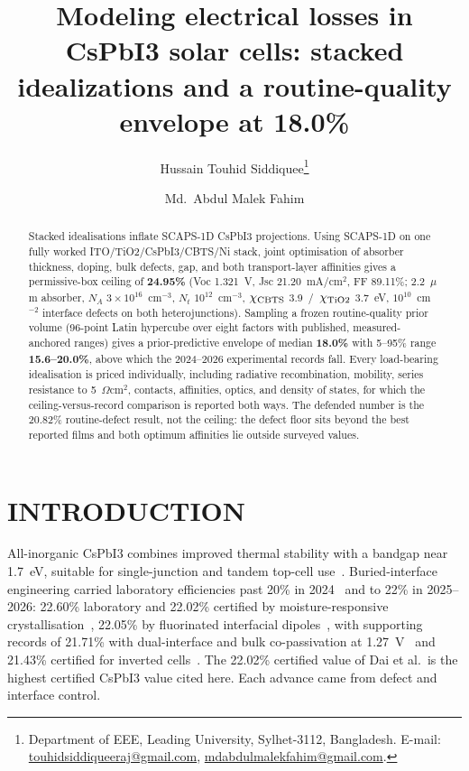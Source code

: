 \documentclass[11pt,a4paper]{article}
\title{Modeling electrical losses in CsPbI3 solar cells: stacked idealizations and a routine-quality envelope at 18.0\%}
\author{Hussain Touhid Siddiquee\thanks{Department of EEE, Leading University, Sylhet-3112, Bangladesh. E-mail: \url{touhidsiddiqueeraj@gmail.com}, \url{mdabdulmalekfahim@gmail.com}.} \and Md.\ Abdul Malek Fahim}
\date{}
\begin{document}
\maketitle

\begin{abstract}
Stacked idealisations inflate SCAPS-1D CsPbI3 projections. Using SCAPS-1D on one fully worked ITO/TiO2/CsPbI3/CBTS/Ni stack, joint optimisation of absorber thickness, doping, bulk defects, gap, and both transport-layer affinities gives a permissive-box ceiling of \textbf{24.95\%} (Voc 1.321~V, Jsc 21.20~mA/cm$^2$, FF 89.11\%; 2.2~$\mu$m absorber, $N_A$ $3\times10^{16}$~cm$^{-3}$, $N_t$ $10^{12}$~cm$^{-3}$, $\chi_{\rm CBTS}$ 3.9~/~$\chi_{\rm TiO2}$ 3.7~eV, $10^{10}$~cm$^{-2}$ interface defects on both heterojunctions). Sampling a frozen routine-quality prior volume (96-point Latin hypercube over eight factors with published, measured-anchored ranges) gives a prior-predictive envelope of median \textbf{18.0\%} with 5--95\% range \textbf{15.6--20.0\%}, above which the 2024--2026 experimental records fall. Every load-bearing idealisation is priced individually, including radiative recombination, mobility, series resistance to 5~$\Omega$cm$^2$, contacts, affinities, optics, and density of states, for which the ceiling-versus-record comparison is reported both ways. The defended number is the 20.82\% routine-defect result, not the ceiling: the defect floor sits beyond the best reported films and both optimum affinities lie outside surveyed values.
\end{abstract}

\medskip
{}
\par

\section{INTRODUCTION}

All-inorganic CsPbI3 combines improved thermal stability with a bandgap near 1.7~eV, suitable for single-junction and tandem top-cell use~\cite{Dai2026,Qiu2025}. Buried-interface engineering carried laboratory efficiencies past 20\% in 2024~\cite{Shah2024} and to 22\% in 2025--2026: 22.60\% laboratory and 22.02\% certified by moisture-responsive crystallisation~\cite{Dai2026}, 22.05\% by fluorinated interfacial dipoles~\cite{Qiu2025}, with supporting records of 21.71\% with dual-interface and bulk co-passivation at 1.27~V~\cite{Zhang2026} and 21.43\% certified for inverted cells~\cite{Joule2026}. The 22.02\% certified value of Dai et al.\ is the highest certified CsPbI3 value cited here. Each advance came from defect and interface control.
\end{document}
